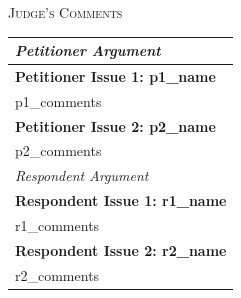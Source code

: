 \documentclass{article}
\begin{document}
\newpage

\begin{center}
    \vspace{1em}
    {\large\textsc{Judge's Comments}}
\end{center}

\renewcommand{\arraystretch}{1.9}
\begin{longtable}{|p{\linewidth}|}
\hline
\rowcolor{yellow!30}
\textit{Petitioner Argument}\\
\hline
\textbf{Petitioner Issue 1: {{ p1_name }}}\\
\hline
{{ p1_comments }}\\
\hline
\textbf{Petitioner Issue 2: {{ p2_name }}}\\
\hline
{{ p2_comments }}\\
\hline
\rowcolor{cyan!20}
\textit{Respondent Argument}\\
\hline
\textbf{Respondent Issue 1: {{ r1_name }}}\\
\hline
{{ r1_comments }}\\
\hline
\textbf{Respondent Issue 2: {{ r2_name }}}\\
\hline
{{ r2_comments }}\\
\hline
\end{longtable}
\end{document}

